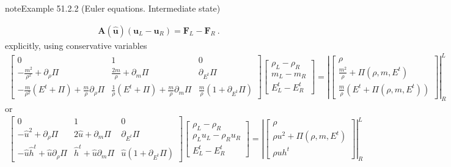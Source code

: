 \documentclass[letterpaper,10pt,english]{jupyterBook}
\begin{document}
\begin{sphinxadmonition}{note}{Example 51.2.2 (Euler equations. Intermediate state)}
\begin{enumerate}
\end{enumerate}
\begin{equation*}
\begin{split}\mathbf{A}(\hat{\mathbf{u}})(\mathbf{u}_L - \mathbf{u}_R) = \mathbf{F}_L - \mathbf{F}_R \ .\end{split}
\end{equation*}
\sphinxAtStartPar
explicitly, using conservative variables
\begin{equation*}
\begin{split}
\begin{bmatrix} 0 & 1 & 0 \\ - \frac{m^2}{\rho^2} + \partial_\rho \Pi & \frac{2 m}{\rho} + \partial_m \Pi & \partial_{E^t} \Pi \\ - \frac{m}{\rho^2}(E^t+\Pi)+ \frac{m}{\rho}\partial_\rho \Pi & \frac{1}{\rho} (E^t + \Pi) + \frac{m}{ \rho} \partial_{m} \Pi & \frac{m}{\rho} \left( 1 + \partial_{E^t} \Pi \right) \end{bmatrix}
\begin{bmatrix} \rho_L - \rho_R \\ m_L - m_R \\ E^t_L - E^t_R \end{bmatrix} = 
\left|\begin{bmatrix} \rho \\ \frac{m^2}{\rho} + \Pi(\rho,m,E^t) \\ \frac{m}{\rho} \left( E^t+\Pi(\rho,m,E^t) \right) \end{bmatrix}\right|^L_R 
\end{split}
\end{equation*}
\sphinxAtStartPar
or
\begin{equation*}
\begin{split}
\begin{bmatrix} 0 & 1 & 0 \\ - \hat{u}^2 + \partial_\rho \Pi & 2 \hat{u} + \partial_m \Pi & \partial_{E^t} \Pi \\ - \hat{u} \hat{h}^t + \hat{u} \partial_\rho \Pi & \hat{h}^t + \hat{u} \partial_{m} \Pi & \hat{u} \left( 1 + \partial_{E^t} \Pi \right) \end{bmatrix}
\begin{bmatrix} \rho_L - \rho_R \\ \rho_L u_L - \rho_R u_R \\ E^t_L - E^t_R \end{bmatrix} = 
\left|\begin{bmatrix} \rho \\ \rho u^2 + \Pi(\rho,m,E^t) \\ \rho u h^t  \end{bmatrix}\right|^L_R 
\end{split}
\end{equation*}


\end{sphinxadmonition}
\end{document}
